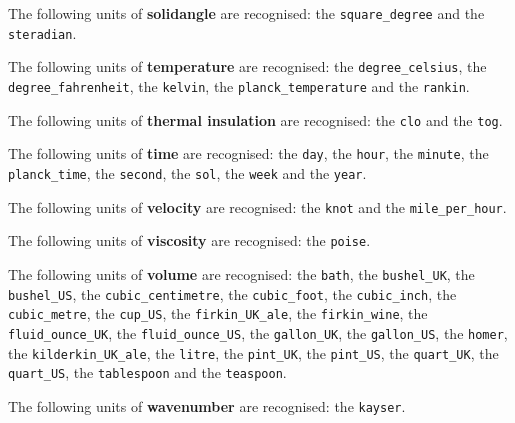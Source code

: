 \noindent The following units of {\bf solidangle} are recognised:\newline
\noindent the {\tt square\_\-degree} and the {\tt steradian}.\vspace{5mm}

\noindent The following units of {\bf temperature} are recognised:\newline
\noindent the {\tt degree\_\-celsius}, the {\tt degree\_\-fahrenheit}, the {\tt kelvin}, the {\tt planck\_\-temperature} and the {\tt rankin}.\vspace{5mm}

\noindent The following units of {\bf thermal insulation} are recognised:\newline
\noindent the {\tt clo} and the {\tt tog}.\vspace{5mm}

\noindent The following units of {\bf time} are recognised:\newline
\noindent the {\tt day}, the {\tt hour}, the {\tt minute}, the {\tt planck\_\-time}, the {\tt second}, the {\tt sol}, the {\tt week} and the {\tt year}.\vspace{5mm}

\noindent The following units of {\bf velocity} are recognised:\newline
\noindent the {\tt knot} and the {\tt mile\_\-per\_\-hour}.\vspace{5mm}

\noindent The following units of {\bf viscosity} are recognised:\newline
\noindent the {\tt poise}.\vspace{5mm}

\noindent The following units of {\bf volume} are recognised:\newline
\noindent the {\tt bath}, the {\tt bushel\_\-UK}, the {\tt bushel\_\-US}, the {\tt cubic\_\-centimetre}, the {\tt cubic\_\-foot}, the {\tt cubic\_\-inch}, the {\tt cubic\_\-metre}, the {\tt cup\_\-US}, the {\tt firkin\_\-UK\_\-ale}, the {\tt firkin\_\-wine}, the {\tt fluid\_\-ounce\_\-UK}, the {\tt fluid\_\-ounce\_\-US}, the {\tt gallon\_\-UK}, the {\tt gallon\_\-US}, the {\tt homer}, the {\tt kilderkin\_\-UK\_\-ale}, the {\tt litre}, the {\tt pint\_\-UK}, the {\tt pint\_\-US}, the {\tt quart\_\-UK}, the {\tt quart\_\-US}, the {\tt tablespoon} and the {\tt teaspoon}.\vspace{5mm}

\noindent The following units of {\bf wavenumber} are recognised:\newline
\noindent the {\tt kayser}.\vspace{5mm}
